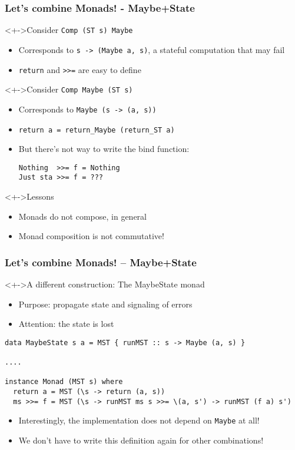 \documentclass[pdftex,aspectratio=169]{beamer}
\begin{document}
\begin{frame}[fragile]
  \frametitle{Let's combine Monads! - Maybe+State}
  \begin{block}<+->{Consider  \lstinline{Comp (ST s) Maybe}}
    \begin{itemize}
    \item Corresponds to \lstinline{s -> (Maybe a, s)}, a stateful
      computation that may fail
    \item \lstinline{return} and \lstinline{>>=} are easy to define
    \end{itemize}
  \end{block}
  \begin{block}<+->{Consider \lstinline{Comp Maybe (ST s)}}
  \begin{itemize}
  \item Corresponds to \lstinline{Maybe (s -> (a, s))} 
    \item \lstinline{return a = return_Maybe (return_ST a)}
    \item But there's not way to write the bind function:
\begin{lstlisting}
Nothing  >>= f = Nothing
Just sta >>= f = ???
\end{lstlisting}
  \end{itemize}
\end{block}
\begin{block}<+->{Lessons}
  \begin{itemize}
  \item Monads do not compose, in general
  \item Monad composition is not commutative!
  \end{itemize}
\end{block}
\end{frame}


\begin{frame}[fragile]
  \frametitle{Let's combine Monads! -- Maybe+State}
  \begin{block}<+->{A different construction: The MaybeState monad}
    \begin{itemize}
    \item Purpose: propagate state and signaling of errors
    \item Attention: the state is lost
    \end{itemize}
      \begin{lstlisting}
data MaybeState s a = MST { runMST :: s -> Maybe (a, s) }

....

instance Monad (MST s) where
  return a = MST (\s -> return (a, s))
  ms >>= f = MST (\s -> runMST ms s >>= \(a, s') -> runMST (f a) s')
      \end{lstlisting}
  \end{block}
  \begin{itemize}
  \item<+->     Interestingly, the implementation does not depend 
    on \lstinline{Maybe} at all! 
  \item<+->     We don't have to write this definition again for other combinations! 
  \end{itemize}
\end{frame}
\end{document}
